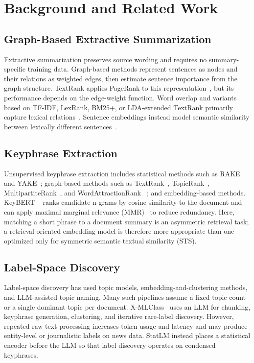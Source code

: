 \section{Background and Related Work}
\label{sec:related}

\subsection{Graph-Based Extractive Summarization}
Extractive summarization preserves source wording and requires no summary-specific
training data. Graph-based methods represent sentences as nodes and their relations
as weighted edges, then estimate sentence importance from the graph structure.
TextRank applies PageRank to this representation~\cite{mihalcea2004textrank}, but
its performance depends on the edge-weight function. Word overlap and variants
based on TF-IDF, LexRank, BM25+, or LDA-extended TextRank primarily capture lexical
relations~\cite{vora2024extractive}. Sentence embeddings instead model semantic
similarity between lexically different sentences~\cite{kadriu2021extractive}.

\subsection{Keyphrase Extraction}
Unsupervised keyphrase extraction includes statistical methods such as RAKE
~\cite{rose2010automatic} and YAKE~\cite{campos2020yake}; graph-based methods such
as TextRank~\cite{mihalcea2004textrank}, TopicRank~\cite{bougouin2013topicrank},
MultipartiteRank~\cite{boudin2018unsupervised}, and WordAttractionRank
~\cite{wang2014corpus}; and embedding-based methods. KeyBERT
~\cite{grootendorst2020keybert} ranks candidate n-grams by cosine similarity to the
document and can apply maximal marginal relevance (MMR)~\cite{carbonell1998use} to
reduce redundancy. Here, matching a short phrase to a document summary is an
asymmetric retrieval task; a retrieval-oriented embedding model is therefore more
appropriate than one optimized only for symmetric semantic textual similarity
(STS).

\subsection{Label-Space Discovery}
Label-space discovery has used topic models, embedding-and-clustering methods, and
LLM-assisted topic naming. Many such pipelines assume a fixed topic count or a
single dominant topic per document. X-MLClass~\cite{li2024open} uses an LLM for
chunking, keyphrase generation, clustering, and iterative rare-label discovery.
However, repeated raw-text processing increases token usage and latency and may
produce entity-level or journalistic labels on news data. StatLM instead places a
statistical encoder before the LLM so that label discovery operates on condensed
keyphrases.

